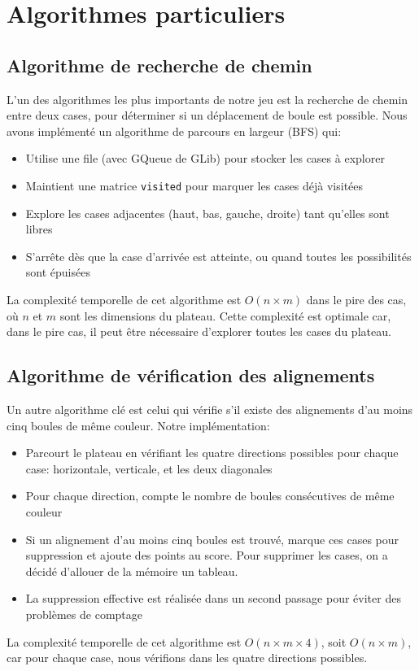 \section{Algorithmes particuliers}\label{algorithmes}

\subsection{Algorithme de recherche de chemin}

L'un des algorithmes les plus importants de notre jeu est la recherche de chemin entre deux cases, pour déterminer si un déplacement de boule est possible. Nous avons implémenté un algorithme de parcours en largeur (BFS) qui:

\begin{itemize}
    \item Utilise une file (avec GQueue de GLib) pour stocker les cases à explorer
    \item Maintient une matrice \texttt{visited} pour marquer les cases déjà visitées
    \item Explore les cases adjacentes (haut, bas, gauche, droite) tant qu'elles sont libres
    \item S'arrête dès que la case d'arrivée est atteinte, ou quand toutes les possibilités sont épuisées
\end{itemize}

La complexité temporelle de cet algorithme est $O(n \times m)$ dans le pire des cas, où $n$ et $m$ sont les dimensions du plateau. Cette complexité est optimale car, dans le pire cas, il peut être nécessaire d'explorer toutes les cases du plateau.

\subsection{Algorithme de vérification des alignements}

Un autre algorithme clé est celui qui vérifie s'il existe des alignements d'au moins cinq boules de même couleur. Notre implémentation:

\begin{itemize}
    \item Parcourt le plateau en vérifiant les quatre directions possibles 
    pour chaque case: horizontale, verticale, et les deux diagonales
    \item Pour chaque direction, compte le nombre de boules consécutives de même couleur
    \item Si un alignement d'au moins cinq boules est trouvé, marque ces cases 
    pour suppression et ajoute des points au score. Pour supprimer les cases, 
    on a décidé d'allouer de la mémoire un tableau.
    \item La suppression effective est réalisée dans un second passage
     pour éviter des problèmes de comptage
\end{itemize}

La complexité temporelle de cet algorithme est $O(n \times m \times 4)$, soit $O(n \times m)$, 
car pour chaque case, nous vérifions dans les quatre directions possibles.
